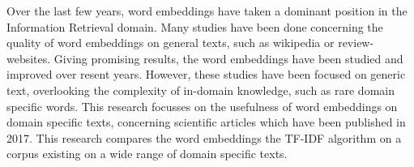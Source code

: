 \documentclass[../../Thesis.tex]{subfiles}
\begin{document}
Over the last few years, word embeddings have taken a dominant position in the Information Retrieval domain. Many studies have been done concerning the quality of word embeddings on general texts, such as wikipedia or review-websites. Giving promising results, the word embeddings have been studied and improved over resent years. However, these studies have been focused on generic text, overlooking the complexity of in-domain knowledge, such as rare domain specific words. This research focusses on the usefulness of word embeddings on domain specific texts, concerning scientific articles which have been published in 2017. This research compares the word embeddings  the TF-IDF algorithm on a corpus existing on a wide range of domain specific texts.
\end{document}
